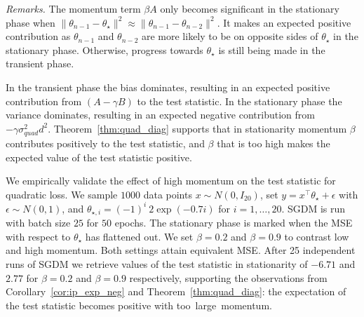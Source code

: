 \documentclass[conference]{IEEEtran}
\begin{document}
\emph{Remarks.}
The momentum term $\beta A$ only becomes significant in the stationary phase when $\| \theta_{n-1} - \theta_\star \|^2 \approx \| \theta_{n-1} - \theta_{n-2} \|^2$.
It makes an expected positive contribution as $\theta_{n-1}$ and $\theta_{n-2}$ are more likely to be on opposite sides of $\theta_\star$ in the stationary phase. Otherwise, progress towards $\theta_\star$ is still being made in the transient phase.

In the transient phase the bias dominates, resulting in an expected positive contribution from $(A-\gamma B)$ to the test statistic. 
In the stationary phase the variance dominates, resulting in an expected negative contribution from $- \gamma \sigma_{quad}^2 d^2$.
Theorem~\ref{thm:quad_diag} supports that in stationarity momentum $\beta$ contributes positively to the test statistic, and $\beta$ that is too high makes the expected value of the test statistic positive.

We empirically validate the effect of high momentum on the test statistic for quadratic loss. 
We sample $1000$ data points $x \sim N ( 0, I_{20} )$, set $y = x^\top \theta_\star + \epsilon$ with $\epsilon \sim N ( 0, 1 )$, and $\theta_{\star, i} = (-1)^{i} \ 2 \exp( -0.7 i )$ for $i = 1, \dots, 20$.
SGDM is run with batch size $25$ for $50$ epochs.
The stationary phase is marked when the MSE with respect to $\theta_\star$ has flattened out. 
We set $\beta=0.2$ and $\beta=0.9$ to contrast low and high momentum. 
Both settings attain equivalent MSE. 
After 25 independent runs of SGDM we retrieve values of the test statistic in stationarity of $-6.71$ and $2.77$ for $\beta=0.2$ and $\beta=0.9$ respectively, supporting the observations from Corollary~\ref{cor:ip_exp_neg} and Theorem~\ref{thm:quad_diag}: the expectation of the test statistic becomes positive with too~large~momentum.


\end{document}

